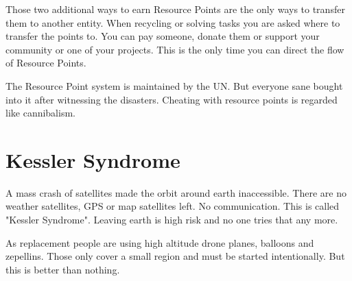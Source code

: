 Those two additional ways to earn Resource Points are the only ways to transfer them to another entity. When recycling or solving tasks you are asked where to transfer the points to. You can pay someone, donate them or support your community or one of your projects. This is the only time you can direct the flow of Resource Points.

The Resource Point system is maintained by the UN. But everyone sane bought into it after witnessing the disasters. Cheating with resource points is regarded like cannibalism.



\section{Kessler Syndrome}
\label{sec: Kessler Syndrome}
A mass crash of satellites made the orbit around earth inaccessible. There are no weather satellites, GPS or map satellites left. No communication.
This is called "Kessler Syndrome". Leaving earth is high risk and no one tries that any more.

As replacement people are using high altitude drone planes, balloons and zepellins. Those only cover a small region and must be started intentionally. But this is better than nothing.